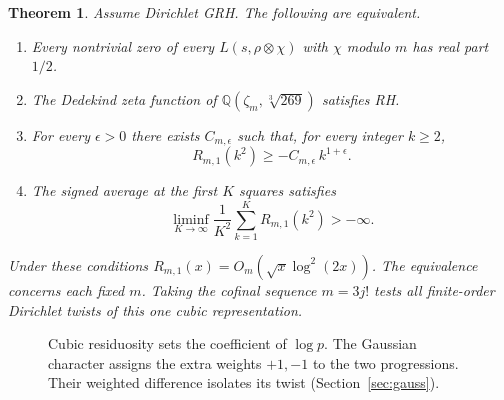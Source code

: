 \documentclass[11pt]{article}
\newtheorem{theorem}{Theorem}
\newcommand{\Q}{\mathbb Q}
\begin{document}
\begin{theorem}\label{thm:race}
Assume Dirichlet GRH. The following are equivalent.
\begin{enumerate}
\item Every nontrivial zero of every $L(s,\rho\otimes\chi)$ with $\chi$ modulo $m$ has real part $1/2$.
\item The Dedekind zeta function of $\Q(\zeta_m,\sqrt[3]{269})$ satisfies RH.
\item For every $\epsilon>0$ there exists $C_{m,\epsilon}$ such that, for every integer $k\ge2$,
\[
                R_{m,1}(k^2)\ge -C_{m,\epsilon}\, k^{1+\epsilon}.
\]
\item The signed average at the first $K$ squares satisfies
\begin{equation}\label{eq:average}
 \liminf_{K\to\infty}\frac{1}{K^2}\sum_{k=1}^K R_{m,1}(k^2)>-\infty.
\end{equation}
\end{enumerate}
Under these conditions $R_{m,1}(x)=O_m(\sqrt{x}\log^2(2x))$. The equivalence concerns each fixed $m$. Taking the cofinal sequence $m=3j!$ tests all finite-order Dirichlet twists of this one cubic representation.
\end{theorem}

\begin{figure}[ht]
\centering
{}
\caption{Cubic residuosity sets the coefficient of $\log p$. The Gaussian character assigns the extra weights $+1,-1$ to the two progressions. Their weighted difference isolates its twist (Section~\ref{sec:gauss}).}
\end{figure}
\end{document}

